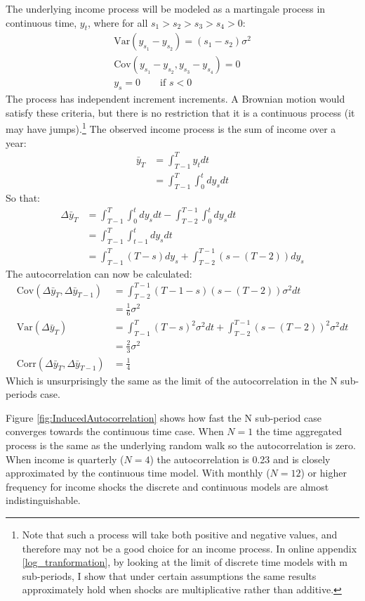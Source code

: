 \documentclass[AER]{AEA}
\begin{document}
The underlying income process will be modeled as a martingale process in continuous time, $y_t$, where for all  $s_1>s_2>s_3>s_4>0$:
\begin{align*}
\mathrm{Var}(y_{s_1}-y_{s_2})=(s_1-s_2)\sigma^2 \\
\mathrm{Cov}(y_{s_1}-y_{s_2},y_{s_3}-y_{s_4}) = 0 \\
y_s = 0 \qquad \text{if } s<0
\end{align*}
The process has independent increment increments. A Brownian motion would satisfy these criteria, but there is no restriction that it is a continuous process (it may have jumps).\footnote{Note that such a process will take both positive and negative values, and therefore may not be a good choice for an income process. In online appendix \ref{log_tranformation}, by looking at the limit of discrete time models with m sub-periods, I show that under certain assumptions the same results approximately hold when shocks are multiplicative rather than additive.} The observed income process is the sum of income over a year:
\begin{align*}
\bar{y}_T &= \int_{T-1}^{T} y_t dt \\
&= \int_{T-1}^{T} \int_{0}^{t} dy_s dt 
\end{align*}
So that:
\begin{align*}
\Delta \bar{y}_T &= \int_{T-1}^{T} \int_{0}^{t} dy_s dt - \int_{T-2}^{T-1} \int_{0}^{t} dy_s dt \\
&= \int_{T-1}^{T} \int_{t-1}^{t} dy_s dt \\
&= \int_{T-1}^{T} (T-s) dy_s + \int_{T-2}^{T-1} (s-(T-2)) dy_s 
\end{align*}
The autocorrelation can now be calculated:
\begin{align*}
\mathrm{Cov}(\Delta \bar{y}_T,\Delta \bar{y}_{T-1}) &=  \int_{T-2}^{T-1} (T-1-s)(s-(T-2)) \sigma^2 dt \\
&= \frac{1}{6}\sigma^2 \\
\mathrm{Var}(\Delta \bar{y}_T) &= \int_{T-1}^{T} (T-s)^2 \sigma^2 dt + \int_{T-2}^{T-1} (s-(T-2))^2 \sigma^2 dt \\
&= \frac{2}{3}\sigma^2 \\
\mathrm{Corr}(\Delta \bar{y}_T,\Delta \bar{y}_{T-1}) &= \frac{1}{4}
\end{align*}
Which is unsurprisingly the same as the limit of the autocorrelation in the N sub-periods case.

Figure \ref{fig:InducedAutocorrelation} shows how fast the N sub-period case converges towards the continuous time case. When $N=1$ the time aggregated process is the same as the underlying random walk so the autocorrelation is zero. When income is quarterly ($N=4$) the autocorrelation is 0.23 and is closely approximated by the continuous time model. With monthly ($N=12$) or higher frequency for income shocks the discrete and continuous models are almost indistinguishable.
\end{document}

